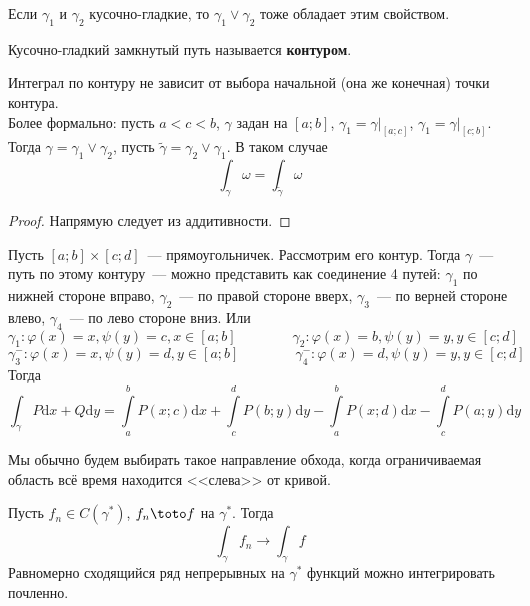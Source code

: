 \documentclass{article}
\begin{document}
    \begin{remark}
        Если $\gamma_1$ и $\gamma_2$ кусочно-гладкие, то $\gamma_1\vee\gamma_2$ тоже обладает этим свойством.
    \end{remark}
    \begin{definition}
        Кусочно-гладкий замкнутый путь называется \textbf{контуром}.
    \end{definition}
    \begin{property}
        Интеграл по контуру не зависит от выбора начальной (она же конечная) точки контура.\\
        Более формально: пусть $a<c<b$, $\gamma$ задан на $[a;b]$, $\gamma_1=\gamma\big|_{[a;c]}$, $\gamma_1=\gamma\big|_{[c;b]}$. Тогда $\gamma=\gamma_1\vee\gamma_2$, пусть $\tilde\gamma=\gamma_2\vee\gamma_1$. В таком случае
        $$
        \int_\gamma\omega=\int_{\tilde\gamma}\omega
        $$
    \end{property}
    \begin{proof}
        Напрямую следует из аддитивности.
    \end{proof}
    \begin{example}
        Пусть $[a;b]\times[c;d]$~--- прямоугольничек. Рассмотрим его контур. Тогда $\gamma$~--- путь по этому контуру~--- можно представить как соединение 4 путей: $\gamma_1$ по нижней стороне вправо, $\gamma_2$~--- по правой стороне вверх, $\gamma_3$~--- по верней стороне влево, $\gamma_4$~--- по лево стороне вниз. Или
        $$
        \gamma_1\colon \varphi(x)=x,\psi(y)=c,x\in[a;b]\qquad\qquad\gamma_2\colon \varphi(x)=b,\psi(y)=y,y\in[c;d]
        $$
        $$
        \gamma_3^-\colon \varphi(x)=x,\psi(y)=d,y\in[a;b]\qquad\qquad\gamma_4^-\colon \varphi(x)=d,\psi(y)=y,y\in[c;d]
        $$
        Тогда
        $$
        \int_\gamma P\mathrm dx+Q\mathrm dy=\int\limits_a^bP(x;c)\mathrm dx+\int\limits_c^dP(b;y)\mathrm dy-\int\limits_a^bP(x;d)\mathrm dx-\int\limits_c^dP(a;y)\mathrm dy
        $$
    \end{example}
    \begin{remark}
        Мы обычно будем выбирать такое направление обхода, когда ограничиваемая область всё время находится <<слева>> от кривой.
    \end{remark}
    \begin{property}
        Пусть $f_n\in C(\gamma^*)$, $f_n\toto f$ на $\gamma^*$. Тогда
        $$
        \int_\gamma f_n\rightarrow\int_\gamma f
        $$
        Равномерно сходящийся ряд непрерывных на $\gamma^*$ функций можно интегрировать почленно.
    \end{property}
\end{document}
